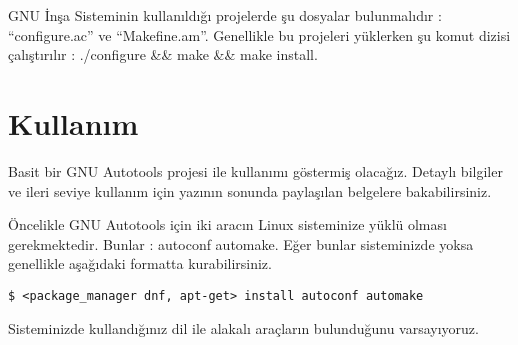 \documentclass[
]{book}
\begin{document}
GNU İnşa Sisteminin kullanıldığı projelerde şu dosyalar bulunmalıdır : ``configure.ac'' ve ``Makefine.am''. Genellikle bu projeleri yüklerken şu komut dizisi çalıştırılır : ./configure \&\& make \&\& make install.

\hypertarget{kullanux131m-2}{%
\section*{Kullanım}\label{kullanux131m-2}}

Basit bir GNU Autotools projesi ile kullanımı göstermiş olacağız. Detaylı bilgiler ve ileri seviye kullanım için yazının sonunda paylaşılan belgelere bakabilirsiniz.

Öncelikle GNU Autotools için iki aracın Linux sisteminize yüklü olması gerekmektedir. Bunlar : autoconf automake. Eğer bunlar sisteminizde yoksa genellikle aşağıdaki formatta kurabilirsiniz.

\texttt{\$\ \textless{}package\_manager\ dnf,\ apt-get\textgreater{}\ install\ autoconf\ automake}

Sisteminizde kullandığınız dil ile alakalı araçların bulunduğunu varsayıyoruz.
\end{document}
